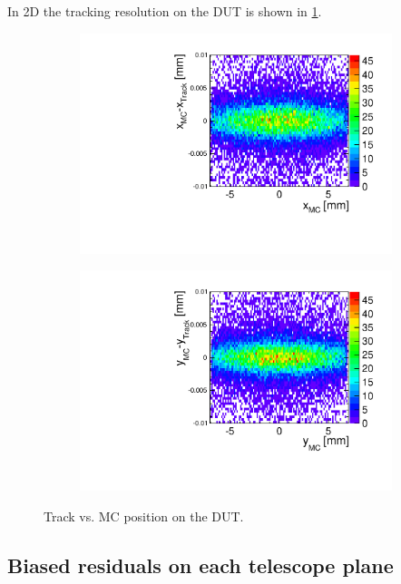 In 2D the tracking resolution on the DUT is shown in \cref{fig:DUT_MC_track_2D}.
\begin{figure}[htbp] \centering
  \begin{subfigure}[b]{0.45\textwidth}
    \includegraphics[width=\textwidth]{figures/Telescope/Unbiased_trackRes_DUT_x_2D.pdf}
    \caption{}
  \end{subfigure}\hfill
  \begin{subfigure}[b]{0.45\textwidth}
    \includegraphics[width=\textwidth]{figures/Telescope/Unbiased_trackRes_DUT_y_2D.pdf}
    \caption{}
  \end{subfigure}
  \caption{Track vs. MC position on the DUT.}
  \label{fig:DUT_MC_track_2D}
\end{figure}

\subsection{Biased residuals on each telescope plane}

